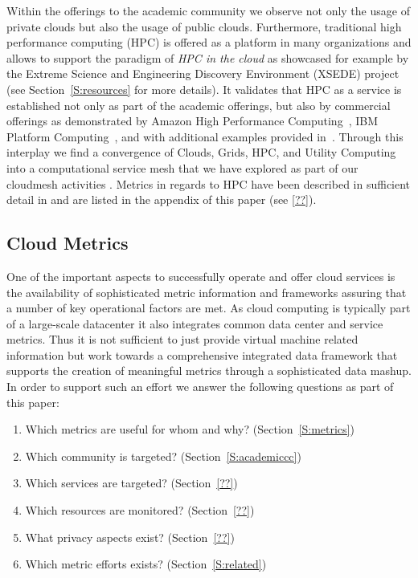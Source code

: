 \documentclass{sig-alternate-05-2015}
\begin{document}
Within the offerings to the academic community we observe not only the usage of private clouds but also the usage of public clouds. Furthermore, traditional high performance computing (HPC) is offered as a platform in many organizations and allows to support the paradigm of {\it HPC in the cloud} as showcased for example by the Extreme Science and Engineering Discovery Environment (XSEDE) project (see Section~\ref {S:resources} for more details).  It validates that HPC as a service is established not only as part of the academic offerings, but also by commercial offerings as demonstrated by Amazon High Performance Computing~\cite{awshpc}, IBM Platform Computing~\cite{ibmhpc}, and with additional examples provided in~\cite{DouglasEadline}. 
Through this interplay we find a convergence of Clouds, Grids, HPC, and Utility Computing into a computational service mesh that we have explored as part of our cloudmesh activities \cite{las14cloudmeshmultiple, las12fg-bookchapter}. Metrics in regards to HPC have been described in sufficient detail in \cite{las13xdmod} and are listed in the appendix of this paper (see \ref{??}).


\subsection{Cloud Metrics}

One of the important aspects to successfully operate and offer cloud services is the availability of sophisticated metric information and frameworks assuring that a number of key operational factors are met. As cloud computing is typically part of a large-scale datacenter it also integrates common data center and service metrics. Thus it is not sufficient to just provide virtual machine related information but work towards a comprehensive integrated data framework that supports the creation of meaningful metrics through a sophisticated data mashup. In order to support such an effort we answer the following questions as part of this paper:

\begin{enumerate}
\setlength\itemsep{-2pt}
\item Which metrics are useful for whom and why? (Section~\ref{S:metrics})
\item Which community is targeted? (Section~\ref{S:academiccc})
\item Which services are targeted? (Section~\ref{??})
\item Which resources are monitored? (Section~\ref{??})
\item What privacy aspects exist? (Section~\ref{??})
\item Which metric efforts exists? (Section~\ref{S:related})
\end{enumerate}
\end{document}
